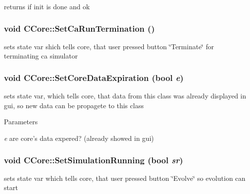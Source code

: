 \label{classCCore_a9cc1459df131a2757809f13e2af2bf9e}
returns if init is done and ok \hypertarget{classCCore_a799587561a1a236c5f62018fb9c7949e}{
\subsubsection[{SetCaRunTermination}]{\setlength{\rightskip}{0pt plus 5cm}void CCore::SetCaRunTermination ()}}
\label{classCCore_a799587561a1a236c5f62018fb9c7949e}
sets state var shich tells core, that user pressed button \char`\"{}Terminate\char`\"{} for terminating ca simulator \hypertarget{classCCore_ae2e68df5908b34b15106820fde4d4de1}{
\subsubsection[{SetCoreDataExpiration}]{\setlength{\rightskip}{0pt plus 5cm}void CCore::SetCoreDataExpiration (bool {\em e})}}
\label{classCCore_ae2e68df5908b34b15106820fde4d4de1}
sets state var, which tells core, that data from this class was already displayed in gui, so new data can be propagete to this class


\begin{DoxyParams}{Parameters}
\item[{\em e}]are core's data expered? (already showed in gui) \end{DoxyParams}
\hypertarget{classCCore_abe4809ea8ec654371e2a412ecbc057ee}{
\subsubsection[{SetSimulationRunning}]{\setlength{\rightskip}{0pt plus 5cm}void CCore::SetSimulationRunning (bool {\em sr})}}
\label{classCCore_abe4809ea8ec654371e2a412ecbc057ee}
sets state var which tells core, that user pressed button \char`\"{}Evolve\char`\"{} so evolution can start


